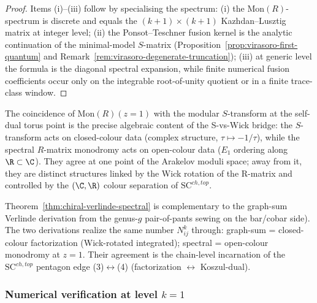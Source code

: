 \begin{proof}
Items (i)--(iii) follow by specialising the spectrum:
(i) the $\mathrm{Mon}(R)$-spectrum is discrete and equals the
$(k{+}1) \times (k{+}1)$ Kazhdan--Lusztig matrix at integer
level; (ii) the Ponsot--Teschner fusion kernel is the
analytic continuation of the minimal-model $S$-matrix
(Proposition~\ref{prop:virasoro-first-quantum} and
Remark~\ref{rem:virasoro-degenerate-truncation}); (iii) at generic
level the formula is the diagonal spectral expansion, while
finite numerical fusion coefficients occur only on the
integrable root-of-unity quotient or in a finite trace-class
window.
\end{proof}

\begin{remark}
\label{rem:chiral-verlinde-v2ap24}
The coincidence of $\mathrm{Mon}(R)(z=1)$ with the modular
$S$-transform at the self-dual torus point is the precise
algebraic content of the S-vs-Wick bridge: the $S$-transform acts on
closed-colour data (complex structure, $\tau \mapsto -1/\tau$),
while the spectral $R$-matrix monodromy acts on open-colour
data ($E_1$ ordering along $\R \subset \C$). They agree at one
point of the Arakelov moduli space; away from it, they are
distinct structures linked by the Wick rotation of the R-matrix and
controlled by the $(\C, \R)$ colour separation of
$\mathrm{SC}^{ch,top}$.
\end{remark}

\begin{remark}
\label{rem:chiral-verlinde-vs-graph-sum}
Theorem~\ref{thm:chiral-verlinde-spectral} is complementary to
the graph-sum Verlinde derivation from the genus-$g$ pair-of-pants sewing on the
bar/cobar side). The two derivations realize the same number
$N^k_{ij}$ through: graph-sum = closed-colour factorization
(Wick-rotated integrated); spectral = open-colour monodromy at
$z=1$. Their agreement is the chain-level incarnation of the
$\mathrm{SC}^{ch,top}$ pentagon edge (3)$\leftrightarrow$(4)
(factorization $\leftrightarrow$ Koszul-dual).
\end{remark}


\subsubsection{Numerical verification at level $k = 1$}
\label{subsubsec:benchmark-k-equals-1}

